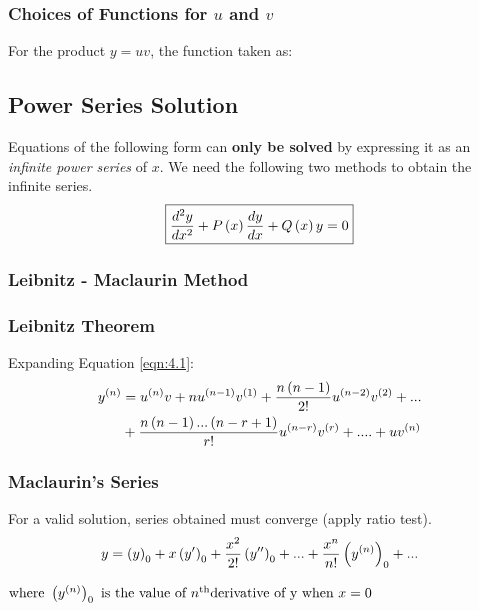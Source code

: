 \subsubsection*{Choices of Functions for $u$ and $v$}
For the product $y=uv$, the function taken as:
\begin{center}
\end{center}
\subsection{Power Series Solution}
Equations of the following form can \textbf{only be solved} by expressing it as an \textit{infinite power series} of $x$. We need the following two methods to obtain the infinite series.
\begin{equation}
    \displaystyle \boxed{\frac{d^2y}{dx^2}+P\left(x\right)\frac{dy}{dx}+Q\left(x\right)y=0}
\end{equation}
\subsubsection{Leibnitz - Maclaurin Method}
\subsubsection*{Leibnitz Theorem}
Expanding Equation \ref{eqn:4.1}:
{
\small
\begin{equation}
    \begin{split}
    y^{\left(n\right)}&=u^{\left(n\right)}v+nu^{\left(n-1\right)}v^{\left(1\right)}+\frac{n\left(n-1\right)}{2!}u^{\left(n-2\right)}v^{\left(2\right)}+...\\
        &+\frac{n\left(n-1\right)...\left(n-r+1\right)}{r!}u^{\left(n-r\right)}v^{\left(r\right)}+....+uv^{\left(n\right)}
\end{split}
\end{equation}
}
\subsubsection*{Maclaurin's Series}
For a valid solution, series obtained must converge (apply ratio test).
\begin{equation}
    y=\left(y\right)_0+x\left(y'\right)_0+\frac{x^2}{2!}\left(y''\right)_0+...+\frac{x^n}{n!}\left(y^{\left(n\right)}\right)_0+...
\end{equation}
\begin{center}
    $\text{where }\left(y^{\left(n\right)}\right)_0 \text{ is the value of }n^{\text{th} }\text{derivative of y when }x=0\nonumber$
\end{center}
